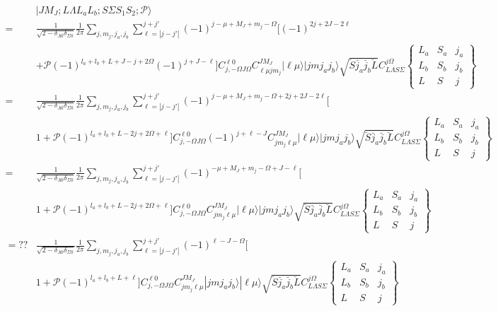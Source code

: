 \documentclass[prl, longbibliography]{revtex4-2}
\begin{document}
\begin{equation}
\begin{split}
&|J M_J; L \Lambda L_a L_b; S \Sigma  S_1 S_2; \mathcal{P} \rangle
\\
=&\frac{1}{\sqrt{2-\delta_{\Lambda 0}\delta_{\Sigma 0}}}
\frac{1}{2\pi}
\sum_{j, m_j, j_a, j_b} 
\sum_{\ell=|j-j'|}^{j+j'} 
(-1)^{j-\mu+M_J+m_j-\Omega}
\bigg[
(-1)^{2j+2J-2\ell}
\\
&+\mathcal{P}(-1)^{l_a+l_b+L+J-j+2\Omega}
(-1)^{j+J-\ell}
\bigg]
C_{j,-\Omega J\Omega}^{\ell 0}
C_{\ell \mu j m_j}^{J M_J}
|\ell\mu\rangle |j m j_a j_b\rangle
\sqrt{\breve{S}\breve{j_a}\breve{j_b}\breve{L}} 
C_{L \Lambda S \Sigma}^{j \Omega}
\begin{Bmatrix}
L_a & S_a & j_a\\
L_b & S_b & j_b\\
L & S & j
\end{Bmatrix}
\\
=&\frac{1}{\sqrt{2-\delta_{\Lambda 0}\delta_{\Sigma 0}}}
\frac{1}{2\pi}
\sum_{j, m_j, j_a, j_b} 
\sum_{\ell=|j-j'|}^{j+j'} 
(-1)^{j-\mu+M_J+m_j-\Omega+2j+2J-2\ell}
\bigg[\\
&1+\mathcal{P}(-1)^{l_a+l_b+L-2j+2\Omega+\ell}
\bigg]
C_{j,-\Omega J\Omega}^{\ell 0}
(-1)^{j+\ell-J}
C_{j m_j\ell \mu}^{J M_J}
|\ell\mu\rangle |j m j_a j_b\rangle
\sqrt{\breve{S}\breve{j_a}\breve{j_b}\breve{L}} 
C_{L \Lambda S \Sigma}^{j \Omega}
\begin{Bmatrix}
L_a & S_a & j_a\\
L_b & S_b & j_b\\
L & S & j
\end{Bmatrix}
\\
=&\frac{1}{\sqrt{2-\delta_{\Lambda 0}\delta_{\Sigma 0}}}
\frac{1}{2\pi}
\sum_{j, m_j, j_a, j_b} 
\sum_{\ell=|j-j'|}^{j+j'} 
(-1)^{-\mu+M_J+m_j-\Omega+J-\ell}
\bigg[\\
&1+\mathcal{P}(-1)^{l_a+l_b+L-2j+2\Omega+\ell}
\bigg]
C_{j,-\Omega J\Omega}^{\ell 0}
C_{j m_j\ell \mu}^{J M_J}
|\ell\mu\rangle |j m j_a j_b\rangle
\sqrt{\breve{S}\breve{j_a}\breve{j_b}\breve{L}} 
C_{L \Lambda S \Sigma}^{j \Omega}
\begin{Bmatrix}
L_a & S_a & j_a\\
L_b & S_b & j_b\\
L & S & j
\end{Bmatrix}\\
=??&\frac{1}{\sqrt{2-\delta_{\Lambda 0}\delta_{\Sigma 0}}}
\frac{1}{2\pi}
\sum_{j, m_j, j_a, j_b} 
\sum_{\ell=|j-j'|}^{j+j'} 
(-1)^{\ell-J-\Omega}
\bigg[\\
&1+\mathcal{P}(-1)^{l_a+l_b+L+\ell}
\bigg]
C_{j,-\Omega J\Omega}^{\ell 0}
C_{j m_j\ell \mu}^{J M_J}
 |j m j_a j_b\rangle|\ell\mu\rangle
\sqrt{\breve{S}\breve{j_a}\breve{j_b}\breve{L}} 
C_{L \Lambda S \Sigma}^{j \Omega} 
\begin{Bmatrix}
L_a & S_a & j_a\\
L_b & S_b & j_b\\
L & S & j
\end{Bmatrix}
\end{split}
\end{equation}
\end{document}
